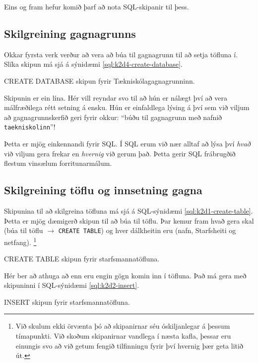Eins og fram hefur komið þarf að nota SQL-skipanir til þess.

\subsection{Skilgreining gagnagrunns}
Okkar fyrsta verk verður að vera að búa til gagnagrunn til að setja töfluna í. Slíka skipun má sjá á sýnidæmi \ref{sql:k2d4-create-database}.

\begin{example}
\caption{CREATE DATABASE skipun fyrir Tækniskólagagnagrunninn.}
\label{sql:k2d4-create-database}
\centering
{}
\end{example}

Skipunin er ein lína. Hér vill reyndar svo til að hún er nálægt því að vera málfræðilega rétt setning á ensku. Hún er einfaldlega lýsing á því sem við viljum að gagnagrunnskerfið geri fyrir okkur: ``búðu til gagnagrunn með nafnið \verb|taekniskolinn|''!

Þetta er mjög einkennandi fyrir SQL. Í SQL erum við nær alltaf að lýsa því \emph{hvað} við viljum gera frekar en \emph{hvernig} við gerum það. Þetta gerir SQL frábrugðið flestum vinsælum forritunarmálum.

\subsection{Skilgreining töflu og innsetning gagna}
Skipunina til að skilgreina töfluna má sjá á SQL-sýnidæmi \ref{sql:k2d1-create-table}. Þetta er mjög dæmigerð skipun til að búa til töflu. Þar kemur fram hvað gera skal (búa til töflu $\rightarrow$ \verb|CREATE TABLE|) og hver dálkheitin eru (nafn, Starfsheiti og netfang). \footnote{Við skulum ekki örvænta þó að skipanirnar séu óskiljanlegar á þessum tímapunkti. Við skoðum skipanirnar vandlega í næsta kafla, þessar eru einungis svo að við getum fengið tilfinningu fyrir því hvernig þær geta litið út.}

\begin{example}[h]
\caption{CREATE TABLE skipun fyrir starfsmannatöfluna.}
\label{sql:k2d1-create-table}
\centering
{}
\end{example}

Hér ber að athuga að enn eru engin gögn komin inn í töfluna. Það má gera með skipuninni í SQL-sýnidæmi \ref{sql:k2d2-insert}.

\begin{example}[h]
\caption{INSERT skipun fyrir starfsmannatöfluna.}
\label{sql:k2d2-insert}
\centering
{\small
{}
}
\end{example}

